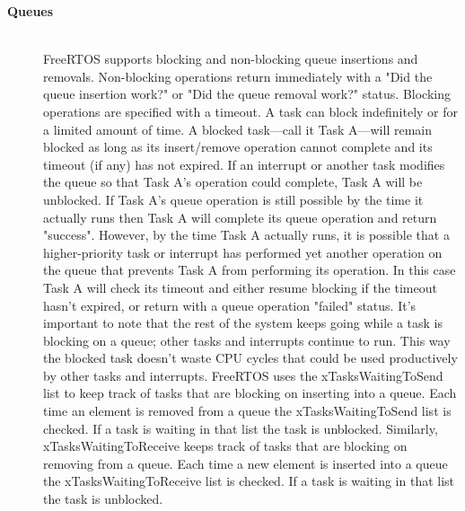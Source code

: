 \begin{description}
\item[{\rot\bf Queues}]~\\[-3ex]
\bi
\ite FreeRTOS supports blocking and non-blocking queue insertions and removals. Non-blocking operations return immediately with a "Did the queue insertion work?" or "Did the queue removal work?" status. Blocking operations are specified with a timeout. A task can block indefinitely or for a limited amount of time.
\ite
\ite A blocked task—call it Task A—will remain blocked as long as its insert/remove operation cannot complete and its timeout (if any) has not expired. If an interrupt or another task modifies the queue so that Task A's operation could complete, Task A will be unblocked. If Task A's queue operation is still possible by the time it actually runs then Task A will complete its queue operation and return "success". However, by the time Task A actually runs, it is possible that a higher-priority task or interrupt has performed yet another operation on the queue that prevents Task A from performing its operation. In this case Task A will check its timeout and either resume blocking if the timeout hasn't expired, or return with a queue operation "failed" status.
\ite
\ite It's important to note that the rest of the system keeps going while a task is blocking on a queue; other tasks and interrupts continue to run. This way the blocked task doesn't waste CPU cycles that could be used productively by other tasks and interrupts.
\ite
\ite FreeRTOS uses the xTasksWaitingToSend list to keep track of tasks that are blocking on inserting into a queue. Each time an element is removed from a queue the xTasksWaitingToSend list is checked. If a task is waiting in that list the task is unblocked.
\ite
\ite Similarly, xTasksWaitingToReceive keeps track of tasks that are blocking on removing from a queue. Each time a new element is inserted into a queue the xTasksWaitingToReceive list is checked. If a task is waiting in that list the task is unblocked.
\ei

\os{\newpage}




\end{description}
